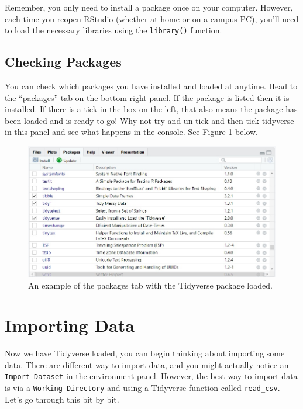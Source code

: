 \documentclass[
]{book}
\let\oldsection\section
\renewcommand{\section}{\needspace{5\baselineskip}\oldsection}
\let\oldsubsection\subsection
\renewcommand{\subsection}{\needspace{3\baselineskip}\oldsubsection}  %
\begin{document}
Remember, you only need to install a package once on your computer. However, each time you reopen RStudio (whether at home or on a campus PC), you'll need to load the necessary libraries using the \texttt{library()} function.

\subsection{Checking Packages}\label{checking-packages}

You can check which packages you have installed and loaded at anytime. Head to the ``packages'' tab on the bottom right panel. If the package is listed then it is installed. If there is a tick in the box on the left, that also means the package has been loaded and is ready to go! Why not try and un-tick and then tick tidyverse in this panel and see what happens in the console. See Figure \ref{fig:fig-environment-3} below.

\begin{figure}[H]

{\centering \includegraphics[width=0.95\linewidth]{images/packages} 

}

\caption{An example of the packages tab with the Tidyverse package loaded.}\label{fig:fig-environment-3}
\end{figure}

\section{Importing Data}\label{importing-data}

Now we have Tidyverse loaded, you can begin thinking about importing some data. There are different way to import data, and you might actually notice an \texttt{Import\ Dataset} in the environment panel. However, the best way to import data is via a \texttt{Working\ Directory} and using a Tidyverse function called \texttt{read\_csv}. Let's go through this bit by bit.
\end{document}
